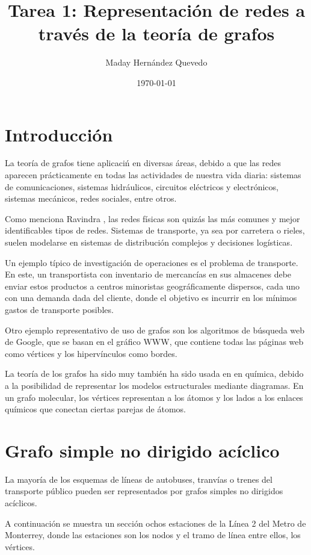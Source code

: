 \documentclass{article}
\title{
Tarea 1: Representación de redes a través de la teoría de grafos
}
\author{Maday Hernández Quevedo}
\date{\today}
\begin{document}
\maketitle

\section*{Introducción}

La teoría de grafos tiene aplicaci\'n en diversas áreas, debido a que las redes aparecen prácticamente en todas las actividades de nuestra vida diaria: sistemas de comunicaciones, sistemas hidráulicos, circuitos eléctricos y electrónicos, sistemas mecánicos, redes sociales, entre otros. 

Como menciona Ravindra \cite{ahuja2017network}, las redes físicas son quizás las más comunes y mejor identificables tipos de redes. Sistemas de transporte, ya sea por carretera o rieles, suelen modelarse en sistemas de distribución complejos y decisiones logísticas.

Un ejemplo típico de investigación de operaciones es el problema de transporte. En este, un transportista con inventario de mercancías en sus almacenes debe enviar estos productos a centros minoristas geográficamente dispersos, cada uno con una demanda dada del cliente, donde el objetivo es incurrir en los mínimos gastos de transporte posibles. 

Otro ejemplo representativo de uso de grafos son los algoritmos de búsqueda web de Google, que se basan en el gráfico WWW, que contiene todas las páginas web como vértices y los  hipervínculos como bordes. \cite{chung2010graph}

La teoría de los grafos ha sido muy también ha sido usada en en química, debido a la posibilidad de representar los modelos estructurales mediante diagramas. En un grafo molecular, los vértices representan a los átomos y los lados a los enlaces químicos que conectan ciertas parejas de átomos. \cite{amador}

\section{Grafo simple no dirigido acíclico}

La mayoría de los esquemas de líneas de autobuses, tranvías o trenes del transporte público pueden ser representados por grafos simples no dirigidos acíclicos.

A continuación se muestra un sección ochos estaciones de la Línea 2 del Metro de Monterrey, donde las estaciones son los nodos y el tramo de línea entre ellos, los vértices. 
\end{document}
